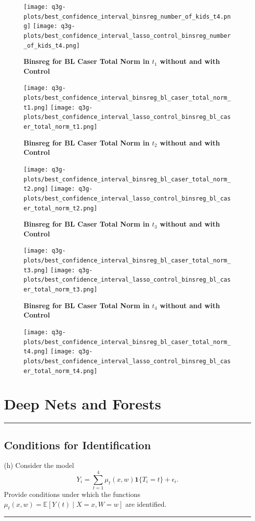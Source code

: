 \documentclass{article}
\newenvironment{colorparagraph}[1]{\par\color{#1}}{\par}
\begin{document}
{\begin{figure}[H]
  \texttt{[image: q3g-plots/best\_confidence\_interval\_binsreg\_number\_of\_kids\_t4.png]}
  \texttt{[image: q3g-plots/best\_confidence\_interval\_lasso\_control\_binsreg\_number\_of\_kids\_t4.png]}
\end{figure}
  \begin{figure}[H]
    \centering
  
  \textbf{Binsreg for BL Caser Total Norm in $t_1$ without and with Control}

    \texttt{[image: q3g-plots/best\_confidence\_interval\_binsreg\_bl\_caser\_total\_norm\_t1.png]}
  \texttt{[image: q3g-plots/best\_confidence\_interval\_lasso\_control\_binsreg\_bl\_caser\_total\_norm\_t1.png]}
  
  \textbf{Binsreg for BL Caser Total Norm in $t_2$ without and with Control}

  \texttt{[image: q3g-plots/best\_confidence\_interval\_binsreg\_bl\_caser\_total\_norm\_t2.png]}
  \texttt{[image: q3g-plots/best\_confidence\_interval\_lasso\_control\_binsreg\_bl\_caser\_total\_norm\_t2.png]}
  
  \textbf{Binsreg for BL Caser Total Norm in $t_3$ without and with Control}

  \texttt{[image: q3g-plots/best\_confidence\_interval\_binsreg\_bl\_caser\_total\_norm\_t3.png]}
  \texttt{[image: q3g-plots/best\_confidence\_interval\_lasso\_control\_binsreg\_bl\_caser\_total\_norm\_t3.png]}
  
  \textbf{Binsreg for BL Caser Total Norm in $t_4$ without and with Control}

  \texttt{[image: q3g-plots/best\_confidence\_interval\_binsreg\_bl\_caser\_total\_norm\_t4.png]}
  \texttt{[image: q3g-plots/best\_confidence\_interval\_lasso\_control\_binsreg\_bl\_caser\_total\_norm\_t4.png]}
\end{figure}
}

\begin{colorparagraph}{questioncolor}
\section*{Deep Nets and Forests}
\label{q3h}
\rule{\textwidth}{0.5pt}
\subsection{Conditions for Identification}
(h) Consider the model
\[
Y_i = \sum_{t=1}^4 \mu_t(x, w) \mathbf{1}\{T_i = t\} + \epsilon_i.
\]
Provide conditions under which the functions \( \mu_t(x, w) = \mathbb{E}[Y(t) \mid X = x, W = w] \) are identified.

\rule{\textwidth}{0.5pt}
\end{colorparagraph}
\end{document}
